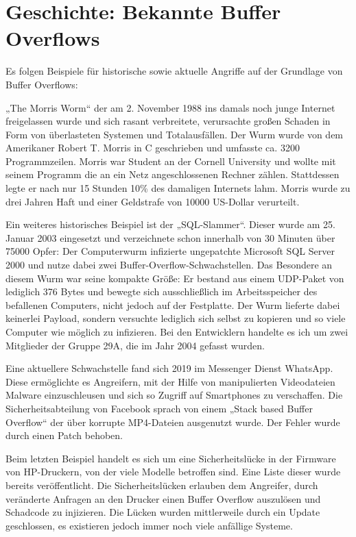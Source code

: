 \section{Geschichte: Bekannte Buffer Overflows} \label{sec:wellknown}
Es folgen Beispiele für historische sowie aktuelle Angriffe auf der Grundlage von Buffer Overflows:

„The Morris Worm“ der am 2. November 1988 ins damals noch junge Internet freigelassen wurde und sich rasant verbreitete,
verursachte großen Schaden in Form von überlasteten Systemen und Totalausfällen. Der Wurm wurde von dem Amerikaner Robert T. Morris in C geschrieben
und umfasste ca. 3200 Programmzeilen. Morris war Student an der Cornell University und wollte mit seinem Programm die an ein Netz angeschlossenen Rechner zählen.
Stattdessen legte er nach nur 15 Stunden 10\% des damaligen Internets lahm. Morris wurde zu drei Jahren Haft und einer Geldstrafe von 10000 US-Dollar verurteilt. \cite{wiki1}

Ein weiteres historisches Beispiel ist der „SQL-Slammer“. Dieser wurde am 25. Januar 2003 eingesetzt und verzeichnete schon innerhalb von 30 Minuten über 75000 Opfer:
Der Computerwurm infizierte ungepatchte Microsoft SQL Server 2000 und nutze dabei zwei Buffer-Overflow-Schwachstellen.
Das Besondere an diesem Wurm war seine kompakte Größe: Er bestand aus einem UDP-Paket von lediglich 376 Bytes und bewegte sich ausschließlich im Arbeitsspeicher des befallenen
Computers, nicht jedoch auf der Festplatte. Der Wurm lieferte dabei keinerlei Payload, sondern versuchte lediglich sich selbst zu kopieren und
so viele Computer wie möglich zu infizieren. Bei den Entwicklern handelte es ich um zwei Mitglieder der Gruppe 29A, die im Jahr 2004 gefasst wurden. \cite{wiki2}

Eine aktuellere Schwachstelle fand sich 2019 im Messenger Dienst WhatsApp. Diese ermöglichte es Angreifern,
mit der Hilfe von manipulierten Videodateien Malware einzuschleusen und sich so Zugriff auf Smartphones zu verschaffen.
Die Sicherheitsabteilung von Facebook sprach von einem „Stack based Buffer Overflow“ der über korrupte MP4-Dateien ausgenutzt wurde.
Der Fehler wurde durch einen Patch behoben. \cite{whatsapp1}

Beim letzten Beispiel handelt es sich um eine Sicherheitslücke in der Firmware von HP-Druckern, von der viele Modelle betroffen sind.
Eine Liste dieser wurde bereits veröffentlicht. Die Sicherheitslücken erlauben dem Angreifer, durch veränderte Anfragen an den Drucker einen Buffer Overflow auszulösen
und Schadcode zu injizieren. Die Lücken wurden mittlerweile durch ein Update geschlossen, es existieren jedoch immer noch viele anfällige Systeme. \cite{hpvuln}

